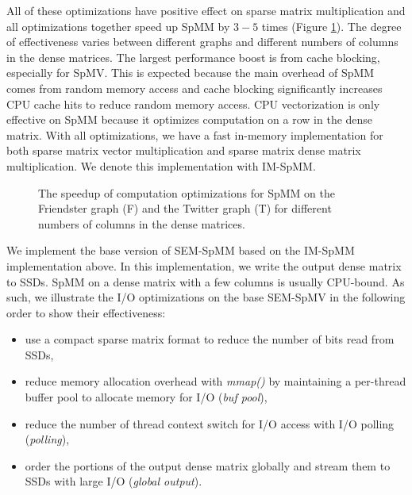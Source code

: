 All of these optimizations have positive effect on sparse matrix
multiplication and all optimizations together speed up SpMM by $3-5$ times
(Figure \ref{perf:spmm_opt}). The degree of effectiveness
varies between different graphs and different numbers of columns in
the dense matrices. The largest performance boost is from cache blocking,
especially for SpMV.
This is expected because the main overhead of SpMM comes from random memory
access and cache blocking significantly increases CPU cache hits to reduce
random memory access. CPU vectorization is only effective on SpMM because
it optimizes computation on a row in the dense matrix.
With all optimizations, we have a fast in-memory implementation for both
sparse matrix vector multiplication and sparse matrix dense matrix multiplication.
We denote this implementation with IM-SpMM.

\begin{figure}
	\begin{center}
		\footnotesize
		
		\caption{The speedup of computation optimizations for SpMM on the Friendster
			graph (F) and the Twitter graph (T) for different numbers of
			columns in the dense matrices.}
		\label{perf:spmm_opt}
	\end{center}
\end{figure}

We implement the base version of SEM-SpMM based on the IM-SpMM implementation
above. In this implementation, we write the output dense matrix to SSDs.
SpMM on a dense matrix with a few columns is usually CPU-bound. As such,
we illustrate the I/O optimizations on the base SEM-SpMV in the following order to show
their effectiveness:
\begin{itemize} \itemsep1pt \parskip0pt 
	\item use a compact sparse matrix format to reduce the number of bits read
		from SSDs,
	\item reduce memory allocation overhead with \textit{mmap()} by maintaining
		a per-thread buffer pool to allocate memory for I/O (\textit{buf pool}),
	\item reduce the number of thread context switch for I/O access with I/O
		polling (\textit{polling}),
	\item order the portions of the output dense matrix globally and stream them
		to SSDs with large I/O (\textit{global output}).
\end{itemize}

